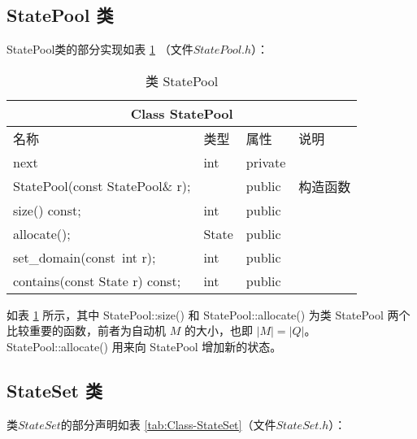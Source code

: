 \subsection{StatePool 类}
StatePool类的部分实现如表 \ref{tab:Class-StatePool} （文件$StatePool.h$）：

\begin{table}[!htbp]
    \caption{类 StatePool}
    \label{tab:Class-StatePool}
    \centering
    \small%
    \setlength{\tabcolsep}{4pt}%
    \renewcommand{\arraystretch}{1.2}%
        \begin{tabular}{llll} %
        \toprule 
         \multicolumn{4}{c}{Class StatePool} \\
        \midrule
        名称& 类型 & 属性  &\mbox{说明} \\
        \midrule
        next & int & private &          \\
        \midrule 
        StatePool(const StatePool\& r);& & public &构造函数 \\
        size() const; & int & public & \\
        allocate();  &   State &  public & \\
        set\_domain(const\ int r); & int & public & \\
        contains(const State r) const; & int & public & \\
        \bottomrule 
    \end{tabular}
\end{table}
如表 \ref{tab:Class-StatePool} 所示，其中 StatePool::size() 和 StatePool::allocate() 为类 StatePool 两个比较重要的函数，前者为自动机 $M$ 的大小，也即 $|M|=|Q|$。 StatePool::allocate() 用来向 StatePool 增加新的状态。
\subsection{StateSet 类}
类$StateSet$的部分声明如表 \ref{tab:Class-StateSet}（文件$StateSet.h$）：
    
